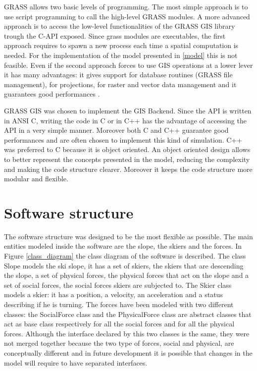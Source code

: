 \documentclass[12pt,a4paper,twoside]{book}
\begin{document}
GRASS allows two basic levels of programming. The most simple approach is to use script programming to call the high-level GRASS modules. A more advanced approach is to access the low-level functionalities of the GRASS GIS library trough the C-API exposed. Since grass modules are executables, the first approach requires to spawn a new process each time a spatial computation is needed. For the implementation of the model presented in \ref{model} this is not feasible. Even if the second approach forces to use GIS operations at a lower lever it has many advantages: it gives support for database routines (GRASS file management), for projections, for raster and  vector data management and it guarantees good performances \cite{net2008}.

GRASS GIS was chosen to implement the GIS Backend. Since the API is written in ANSI C, writing the code in C or in C++ has the advantage of accessing the API in a very simple manner. Moreover both C and C++ guarantee good performances and are often chosen to implement this kind of simulation. C++ was preferred to C because it is object oriented. An object oriented design allows to better represent the concepts presented in the model, reducing the complexity and making the code structure clearer. Moreover it keeps the code structure more modular and flexible.

\section{Software structure}
The software structure was designed to be the most flexible as possible. The main entities modeled inside the software are the slope, the skiers and the forces. In Figure \ref{class_diagram} the class diagram of the software is described. The class Slope models the ski slope, it has a set of skiers, the skiers that are descending the slope, a set of physical forces, the physical forces that act on the slope and a set of social forces, the social forces skiers are subjected to. The Skier class models a skier: it has a position, a velocity, an acceleration and a status describing if he is turning. The forces have been modeled with two different classes: the SocialForce class and the PhysicalForce class are abstract classes that act as base class respectively for all the social forces and for all the physical forces. Although the interface declared by this two classes is the same, they were not merged together because the two type of forces, social and physical, are conceptually different and in future development it is possible that changes in the model will require to have separated interfaces.
\end{document}
